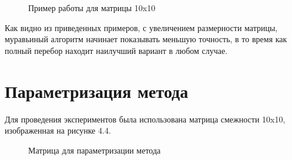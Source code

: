 \documentclass[a4paper,12pt]{report}
\begin{document}
\begin{figure}[ht!]
\caption{Пример работы для матрицы 10x10}
\end{figure}

Как видно из приведенных примеров, с увеличением размерности матрицы, муравьиный алгоритм начинает показывать меньшую точность, в то время как полный перебор находит наилучший вариант в любом случае. 

\section{Параметризация метода}
\hspace{0.6cm} Для проведения экспериментов была использована матрица смежности 10x10, изображенная на рисунке 4.4. 

\begin{figure}[ht!]
\caption{Матрица для параметризации метода}
\end{figure}
\end{document}
